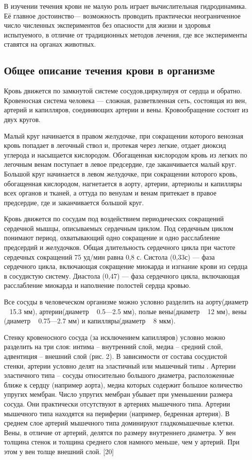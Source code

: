 В изучении течения крови не малую роль играет вычислительная гидродинамика. Её главное достоинство— возможность проводить практически неограниченное число численных экспериментов без опасности для жизни и здоровья испытуемого, в отличие от традиционных методов лечения, где все эксперименты ставятся на органах животных.

\subsection{Общее описание течения крови в организме}
Кровь движется по замкнутой системе сосудов,циркулируя от сердца и обратно. Кровеносная система человека — сложная, разветвленная сеть, состоящая из вен, артерий и капилляров, соединяющих артерии и вены. Кровообращение состоит из двух кругов.

Малый круг начинается в правом желудочке, при сокращении которого венозная кровь попадает в легочный ствол и, протекая через легкие, отдает диоксид углерода и насыщается кислородом. Обогащенная кислородом кровь из легких по легочным венам поступает в левое предсердие, где заканчивается малый круг. Большой круг начинается в левом желудочке, при сокращении которого кровь, обогащенная кислородом, нагнетается в аорту, артерии, артериолы и капилляры всех органов и тканей, а оттуда по венулам и венам притекает в правое предсердие, где и заканчивается большой круг.

Кровь движется по сосудам под воздействием периодических сокращений сердечной мышцы, описываемых сердечным циклом. Под сердечным циклом понимают период, охватывающий одно сокращение и одно расслабление предсердий и желудочков. Общая длительность сердечного цикла при частоте сердечных сокращений 75 уд/мин равна 0,8 с. Систола (0,33с) — фаза сердечного цикла, включающая сокращение миокарда и изгнание крови из сердца в сосудистую систему. Диастола (0,47) — фаза сердечного цикла, включающая расслабление миокарда и наполнение полостей сердца кровью.

Все сосуды в человеческом организме можно условно разделить на аорту(диаметр ~ 15.3 мм), артерии(диаметр ~ 0.5—2.5 мм), полые вены(диаметр ~ 12 мм), вены (диаметр ~ 0.75—2.7 мм) и капилляры(диаметр ~ 8 мкм).

Стенку кровеносного сосуда (за исключением капилляров) условно можно разделить на три слоя: интима – внутренний слой, медиа – средний слой, адвентиция – внешний слой (рис. 2).
В зависимости от состава сосудистой стенки, артерии условно делят на эластичный или мышечный типы . Артерии эластичного типа – сосуды относительно большого диаметра, расположенные ближе к сердцу (например аорта), медиа которых содержит большое количество упругих мембран. Число упругих мембран убывает при уменьшении размера сосуда. Они практически отсутствуют в артериях мышечного типа. Артерии мышечного типа находятся на периферии (например, бедренная артерия). В среднем слое артерий мышечного типа доминируют гладкомышечные клетки. Вены, в отличие от артерий, делятся по размеру внутреннего диаметра. У вен толщина стенок и толщина среднего слоя намного меньше, чем у артерий. При этом у вен толще внешний слой. [20] 



